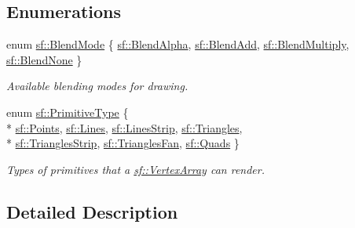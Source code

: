 \subsection*{Enumerations}
\begin{DoxyCompactItemize}
\item 
enum \hyperlink{group__graphics_ga80c52fe2f7050d7f7573b7ed3c995388}{sf\-::\-Blend\-Mode} \{ \hyperlink{group__graphics_gga80c52fe2f7050d7f7573b7ed3c995388aaf30f92cf1471a031fce5d61e8674996}{sf\-::\-Blend\-Alpha}, 
\hyperlink{group__graphics_gga80c52fe2f7050d7f7573b7ed3c995388afc35de7c9fe26776b839cfe0027b16da}{sf\-::\-Blend\-Add}, 
\hyperlink{group__graphics_gga80c52fe2f7050d7f7573b7ed3c995388a8adc43071db8f20e508c35e172195234}{sf\-::\-Blend\-Multiply}, 
\hyperlink{group__graphics_gga80c52fe2f7050d7f7573b7ed3c995388abe282fb5f49c20b6439cbec9d4f63722}{sf\-::\-Blend\-None}
 \}
\begin{DoxyCompactList}\small\item\em Available blending modes for drawing. \end{DoxyCompactList}\item 
enum \hyperlink{group__graphics_ga5ee56ac1339984909610713096283b1b}{sf\-::\-Primitive\-Type} \{ \\*
\hyperlink{group__graphics_gga5ee56ac1339984909610713096283b1bac7097d3e01778b9318def1f7ac35a785}{sf\-::\-Points}, 
\hyperlink{group__graphics_gga5ee56ac1339984909610713096283b1ba2bf015eeff9f798dfc3d6d744d669f1e}{sf\-::\-Lines}, 
\hyperlink{group__graphics_gga5ee56ac1339984909610713096283b1ba5b09910f5d0f39641342184ccd0d1de3}{sf\-::\-Lines\-Strip}, 
\hyperlink{group__graphics_gga5ee56ac1339984909610713096283b1ba880a7aa72c20b9f9beb7eb64d2434670}{sf\-::\-Triangles}, 
\\*
\hyperlink{group__graphics_gga5ee56ac1339984909610713096283b1ba66643dbbb24bbacb405973ed80eebae0}{sf\-::\-Triangles\-Strip}, 
\hyperlink{group__graphics_gga5ee56ac1339984909610713096283b1ba5338a2c6d922151fe50f235036af8a20}{sf\-::\-Triangles\-Fan}, 
\hyperlink{group__graphics_gga5ee56ac1339984909610713096283b1ba5041359b76b4bd3d3e6ef738826b8743}{sf\-::\-Quads}
 \}
\begin{DoxyCompactList}\small\item\em Types of primitives that a \hyperlink{classsf_1_1_vertex_array}{sf\-::\-Vertex\-Array} can render. \end{DoxyCompactList}\end{DoxyCompactItemize}


\subsection{Detailed Description}


